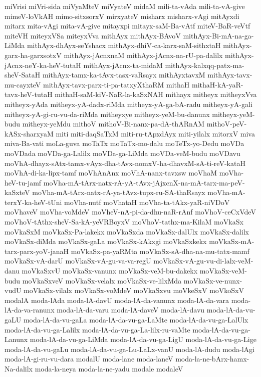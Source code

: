 {miVrisi
miVri-sida
miVyaMteV
miVyateV
midaM
mili-ta-vAda
mili-ta-vA-give
mimeV-loVkAH
mimo-sitxsorxV
mirxyateV
misharx
misharx-vAgi
mitAyxdi
mitarx
mita-vAgi
mita-vA-give
mitayxpi
mitayx-saM-Ba-vAtf
miteV-BaR-veVtf
miteVH
miteyxVSa
miteyxVva
mithAyx
mithAyx-BAvoV
mithAyx-Bi-mA-na-ga-LiMda
mithAyx-dhAyx-seYshacx
mithAyx-dhiV-ca-karx-saM-sithxtaH
mithAyx-garx-ha-garxsotxV
mithAyx-jAcnxnaM
mithAyx-jAcnx-na-rU-pa-dalilx
mithAyx-jAcnx-neY-ka-heV-tutaH
mithAyx-jAcnx-ta-midaM
mithAyx-kalxqq-patx-ma-sheV-SataH
mithAyx-tamx-ka-tAvx-tasx-vaRsayx
mithAyxtavxM
mithAyx-tavx-mu-cayxteV
mithAyx-tavx-parx-ti-pa-tatxyXthaRM
mithaH
mithaH-kA-yaR-tavx-heV-tutaH
mithaH-saM-kiV-NaR-la-kaSxNAH
mithayx
mitheyx
mitheyxVva
mitheyx-yAda
mitheyx-yA-dadx-riMda
mitheyx-yA-ga-bA-radu
mitheyx-yA-gali
mitheyx-yA-gi-ru-vu-da-riMda
mitheyxye
mitheyx-yeM-bu-danunx
mitheyx-yeM-budu
mitheyx-yeMdu
mithoV
mithoV-Bi-nanx-pa-dA-thARnAM
mithoV-peV-kASx-sharxyaM
miti
miti-daqSaTxM
miti-ru-tApxdAyx
miti-yilalx
mitorxV
miva
miva-Ba-vati
moLa-guva
moTaTx
moTaTx-mo-dalu
moTeTx-yo-Dedu
moVDa
moVDada
moVDa-ga-Lalilx
moVDa-ga-LiMda
moVDa-veM-budu
moVDavu
moVhA-dhayx-sAtx-tamx-vAyx-dha-tAvx-nomxV-ha-dhavxM-sA-ti-reV-kataH
moVhA-di-ka-lipx-tamf
moVhAnAnx
moVhA-nanx-tavxsw
moVhaM
moVha-heV-tu-jamf
moVha-mA-tArx-natx-rA-yA-tAvx-jAjxcnX-na-mA-tarx-ma-peV-kaSxteV
moVha-mA-tArx-natx-rA-ya-tAvx-tupx-ru-SA-thaRsayx
moVha-mA-terxY-ka-heV-tUni
moVha-nutf
moVhataH
moVha-ta-tAkx-yaR-niVDoV
moVhaveV
moVha-voMdeV
moVheV-nA-pi-da-dhu-naR-rAnf
moVhoV-ceCxVdeV
moVhoV-tAthx-sheV-Sa-kA-yeVRBoyxV
moVhoV-tathx-ma-KilaM
moVkaSx
moVkaSxM
moVkaSx-Pa-lakekx
moVkaSxda
moVkaSx-dalUlx
moVkaSx-dalilx
moVkaSx-diMda
moVkaSx-gaLa
moVkaSx-kAkxgi
moVkaSxkekx
moVkaSx-mA-tarx-parx-yoV-janaH
moVkaSx-pa-yaRMta
moVkaSx-sA-dha-na-mu-tatx-mamf
moVkaSx-vA-darU
moVkaSx-vA-gu-va-va-regU
moVkaSx-vA-gu-vu-di-lalx-veM-danu
moVkaSxvU
moVkaSx-vanunx
moVkaSx-veM-bu-dakekx
moVkaSx-veM-budu
moVkaSxveV
moVkaSx-velalx
moVkaSx-ve-lilxMda
moVkaSx-ve-nunx-vudU
moVkaSx-vilalx
moVkaSx-voMdeV
moVkaSxvu
moVkeSxV
moVkoSxV
modalA
moda-lAda
moda-lA-davU
moda-lA-da-vanunx
moda-lA-da-vara
moda-lA-da-va-ranunx
moda-lA-da-varu
moda-lA-daveV
moda-lA-davu
moda-lA-da-vu-gaLU
moda-lA-da-vu-gaLa
moda-lA-da-vu-ga-LaMte
moda-lA-da-vu-ga-LalUlx
moda-lA-da-vu-ga-Lalilx
moda-lA-da-vu-ga-La-lilx-ru-vaMte
moda-lA-da-vu-ga-Lanunx
moda-lA-da-vu-ga-LiMda
moda-lA-da-vu-ga-LigU
moda-lA-da-vu-ga-Lige
moda-lA-da-vu-gaLu
moda-lA-da-vu-ga-Lu-LaLx-vanU
moda-lA-dudu
moda-lAgi
moda-lA-gi-ru-vu-dara
modalU
moda-lane
moda-laneV
moda-la-ne-bArx-hamx-Na-dalilx
moda-la-neya
moda-la-ne-yadu
modale
modaleV
}
